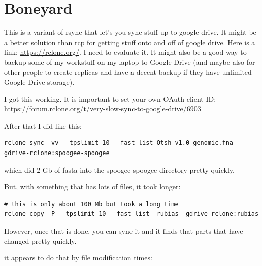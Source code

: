 \documentclass[]{krantz}
\begin{document}
\hypertarget{boneyard}{%
\section{Boneyard}\label{boneyard}}

This is a variant of rsync that let's you sync stuff up to google drive. It might be a better
solution than rcp for getting stuff onto and off of google drive. Here is a link:
\url{https://rclone.org/}. I need to evaluate it. It might also be a good way
to backup some of my workstuff on my laptop to Google Drive (and maybe also for other people to create replicas and have a decent backup if they have unlimited Google Drive storage).

I got this working. It is important to set your own OAuth client ID:
\url{https://forum.rclone.org/t/very-slow-sync-to-google-drive/6903}

After that I did like this:

\begin{verbatim}
rclone sync -vv --tpslimit 10 --fast-list Otsh_v1.0_genomic.fna  gdrive-rclone:spoogee-spoogee
\end{verbatim}

which did 2 Gb of fasta into the spoogee-spoogee directory pretty quickly.

But, with something that has lots of files, it took longer:

\begin{verbatim}
# this is only about 100 Mb but took a long time
rclone copy -P --tpslimit 10 --fast-list  rubias  gdrive-rclone:rubias
\end{verbatim}

However, once that is done, you can sync it and it finds that parts that have changed pretty quickly.

it appears to do that by file modification times:
\end{document}
